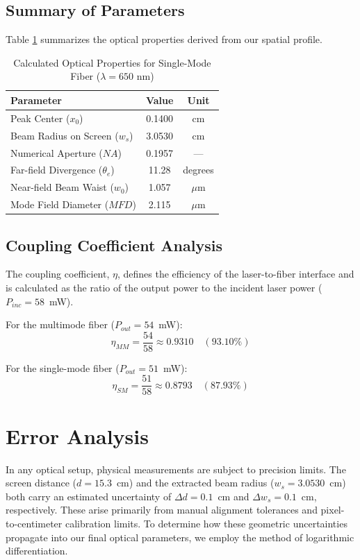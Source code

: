 \subsection{Summary of Parameters}
Table \ref{tab:smf_params} summarizes the optical properties derived from our spatial profile.

\begin{table}[H]
\centering
\caption{Calculated Optical Properties for Single-Mode Fiber ($\lambda = 650$ nm)}
\vspace{0.2cm}
\begin{tabular}{|l|c|c|}
\toprule
\textbf{Parameter} & \textbf{Value} & \textbf{Unit} \\ \midrule
Peak Center ($x_0$) & 0.1400 & cm \\
Beam Radius on Screen ($w_s$) & 3.0530 & cm \\
Numerical Aperture ($NA$) & 0.1957 & --- \\
Far-field Divergence ($\theta_e$) & 11.28 & degrees \\
Near-field Beam Waist ($w_0$) & 1.057 & $\mu$m \\
Mode Field Diameter ($MFD$) & 2.115 & $\mu$m \\ \bottomrule
\end{tabular}
\label{tab:smf_params}
\end{table}

\subsection{Coupling Coefficient Analysis}
The coupling coefficient, $\eta$, defines the efficiency of the laser-to-fiber interface and is calculated as the ratio of the output power to the incident laser power ($P_{inc} = 58$~mW). 

For the multimode fiber ($P_{out} = 54$~mW):
\begin{equation}
    \eta_{MM} = \frac{54}{58} \approx 0.9310 \quad (93.10\%)
\end{equation}

For the single-mode fiber ($P_{out} = 51$~mW):
\begin{equation}
    \eta_{SM} = \frac{51}{58} \approx 0.8793 \quad (87.93\%)
\end{equation}
\section{Error Analysis}

In any optical setup, physical measurements are subject to precision limits. The screen distance ($d = 15.3$~cm) and the extracted beam radius ($w_s = 3.0530$~cm) both carry an estimated uncertainty of $\Delta d = 0.1$~cm and $\Delta w_s = 0.1$~cm, respectively. These arise primarily from manual alignment tolerances and pixel-to-centimeter calibration limits. To determine how these geometric uncertainties propagate into our final optical parameters, we employ the method of logarithmic differentiation.

